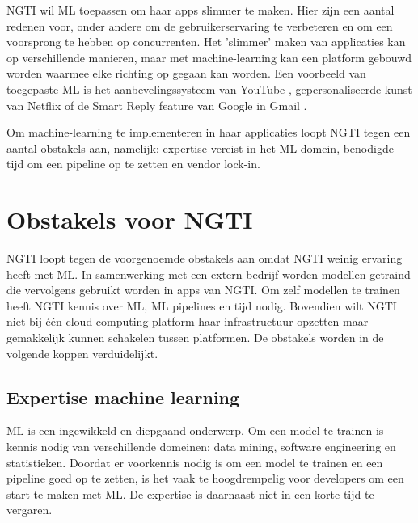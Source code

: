 NGTI wil ML toepassen om haar apps slimmer te maken. Hier zijn een aantal redenen voor, onder andere om de gebruikerservaring te verbeteren en om een voorsprong te hebben op concurrenten. Het 'slimmer' maken van applicaties kan op verschillende manieren, maar met machine-learning kan een platform gebouwd worden waarmee elke richting op gegaan kan worden. Een voorbeeld van toegepaste ML is het aanbevelingssysteem van YouTube \cite{youtube-recommendation-system}, gepersonaliseerde kunst van Netflix \cite{netflix-personalized-art} of de Smart Reply feature van Google in Gmail \cite{smart-reply-gmail}.

Om machine-learning te implementeren in haar applicaties loopt NGTI tegen een aantal obstakels aan, namelijk: expertise vereist in het ML domein, benodigde tijd om een pipeline op te zetten en vendor lock-in.

\section{Obstakels voor NGTI}\label{sec:ch2-obstakels-voor-ngti}
NGTI loopt tegen de voorgenoemde obstakels aan omdat NGTI weinig ervaring heeft met ML. In samenwerking met een extern bedrijf worden modellen getraind die vervolgens gebruikt worden in apps van NGTI. Om zelf modellen te trainen heeft NGTI kennis over ML, ML pipelines en tijd nodig. Bovendien wilt NGTI niet bij één cloud computing platform haar infrastructuur opzetten maar gemakkelijk kunnen schakelen tussen platformen. De obstakels worden in de volgende koppen verduidelijkt.

\subsection{Expertise machine learning}\label{subsec:ch2-expertise-machine-learning}
ML is een ingewikkeld en diepgaand onderwerp. Om een model te trainen is kennis nodig van verschillende domeinen: data mining, software engineering en statistieken. Doordat er voorkennis nodig is om een model te trainen en een pipeline goed op te zetten, is het vaak te hoogdrempelig voor developers om een start te maken met ML. De expertise is daarnaast niet in een korte tijd te vergaren.

